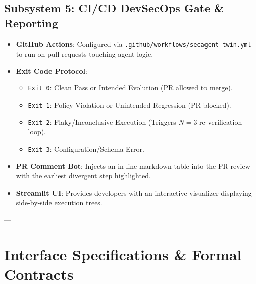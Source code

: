 \documentclass[11pt,a4paper]{article}
\begin{document}
\subsection{Subsystem 5: CI/CD DevSecOps Gate \& Reporting}
\begin{itemize}[leftmargin=1.5em,noitemsep]
    \item \textbf{GitHub Actions}: Configured via \texttt{.github/workflows/secagent-twin.yml} to run on pull requests touching agent logic.
    \item \textbf{Exit Code Protocol}:
    \begin{itemize}[noitemsep]
        \item \texttt{Exit 0}: Clean Pass or Intended Evolution (PR allowed to merge).
        \item \texttt{Exit 1}: Policy Violation or Unintended Regression (PR blocked).
        \item \texttt{Exit 2}: Flaky/Inconclusive Execution (Triggers $N=3$ re-verification loop).
        \item \texttt{Exit 3}: Configuration/Schema Error.
    \end{itemize}
    \item \textbf{PR Comment Bot}: Injects an in-line markdown table into the PR review with the earliest divergent step highlighted.
    \item \textbf{Streamlit UI}: Provides developers with an interactive visualizer displaying side-by-side execution trees.
\end{itemize}

---

\section{Interface Specifications \& Formal Contracts}
\end{document}
